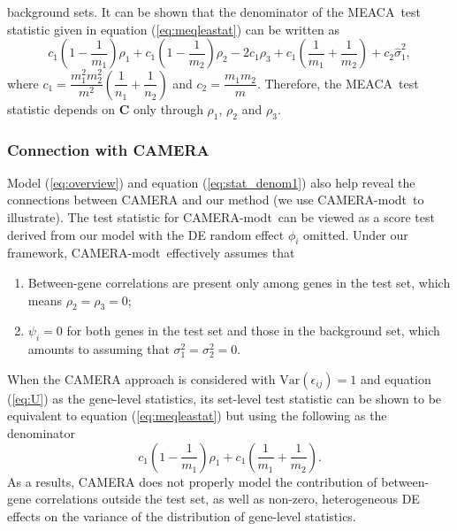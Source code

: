 \documentclass[a4,center,fleqn]{NAR}
\newcommand{\OurMethod}{MEACA}
\newcommand{\CMT}{CAMERA-modt}
\begin{document}
	background sets. It can be shown that the denominator of the \OurMethod~test statistic given in 
	equation (\ref{eq:meqleastat}) can be written as
	\begin{equation}\label{eq:stat_denom1}
	c_1(1-\dfrac{1}{m_1})\rho_1 + c_1(1-\dfrac{1}{m_2})\rho_2 - 2c_1\rho_3 + 
	c_1(\dfrac{1}{m_1}+\dfrac{1}{m_2})+c_2\hat\sigma_1^2,
	\end{equation}
	where $c_1=\dfrac{m_1^2m_2^2}{m^2}(\dfrac{1}{n_1}+\dfrac{1}{n_2})$ and $c_2=\dfrac{m_1m_2}{m}$. 
	Therefore, the \OurMethod~test statistic depends on $\bm C$ only through $\rho_1$, $\rho_2$ and 
	$\rho_3$. 

	
		\subsubsection{Connection with CAMERA}
		Model (\ref{eq:overview})  and equation (\ref{eq:stat_denom1}) also help reveal the 
		connections between CAMERA and our method (we use \CMT~to illustrate). 	
		The test statistic for \CMT~can be viewed as a score test derived from our model with the 
		DE 
		random effect $\phi_i$ omitted. 
		Under our framework, \CMT~effectively assumes that 
		\begin{enumerate}
			\item Between-gene correlations are present only among genes 
			in the test set, which means  $\rho_2=\rho_3=0$;
			\item  $\psi_i=0$ for both genes in the test set and those in the background set, which 
			amounts to assuming that  
			$\sigma_1^2=\sigma_2^2=0$.
		\end{enumerate}
		When the CAMERA approach is considered %
		with 
		$\mbox{Var}(\epsilon_{ij})=1$ and equation (\ref{eq:U}) as the gene-level statistics, its 
		set-level test 
		statistic can be shown to be equivalent to equation (\ref{eq:meqleastat}) but using the 
		following as the denominator
		\begin{equation}\label{eq:stat_denom2}
		c_1(1-\dfrac{1}{m_1})\rho_1 + c_1(\dfrac{1}{m_1}+\dfrac{1}{m_2}).
		\end{equation}
		As a results, CAMERA does not properly model the contribution of between-gene correlations 
		outside the test set, as well as non-zero,
		heterogeneous DE effects on the variance of the distribution of gene-level
		statistics. 
		
\end{document}
